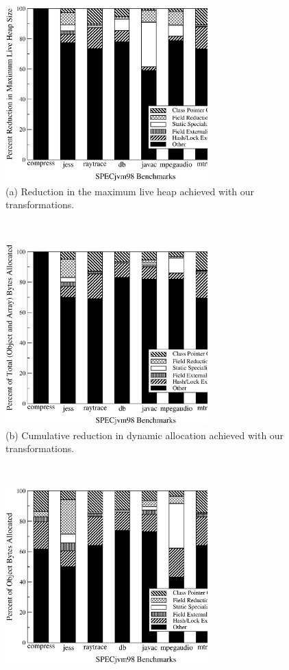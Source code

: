 \documentclass{acmconf}
\begin{document}
\begin{figure}
\begin{center}%
\parbox[b]{8cm}{\centering%
\includegraphics[width=7.8cm,clip=true]{Figures/sas-ttllive.eps}\\
(a) Reduction in the maximum live heap achieved with our transformations.}%
~~\parbox[b]{8cm}{\centering%
\includegraphics[width=7.8cm,clip=true]{Figures/sas-ttlalloc.eps}\\
(b) Cumulative reduction in dynamic allocation achieved with
    our transformations.
}%
\\[.3cm]
\parbox[b]{8cm}{\centering%
\includegraphics[width=7.8cm,clip=true]{Figures/sas-objalloc.eps}\\
}
\end{center}
\end{figure}
\end{document}
